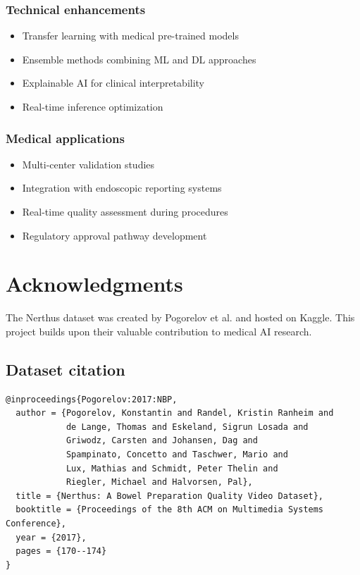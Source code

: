 \documentclass[11pt]{article}
\begin{document}
\subsubsection{Technical enhancements}
\begin{itemize}
    \item Transfer learning with medical pre-trained models
    \item Ensemble methods combining ML and DL approaches
    \item Explainable AI for clinical interpretability
    \item Real-time inference optimization
\end{itemize}

\subsubsection{Medical applications}
\begin{itemize}
    \item Multi-center validation studies
    \item Integration with endoscopic reporting systems
    \item Real-time quality assessment during procedures
    \item Regulatory approval pathway development
\end{itemize}

\section*{Acknowledgments}

The Nerthus dataset was created by Pogorelov et al. and hosted on Kaggle. This project builds upon their valuable contribution to medical AI research.

\subsection*{Dataset citation}
\begin{verbatim}
@inproceedings{Pogorelov:2017:NBP,
  author = {Pogorelov, Konstantin and Randel, Kristin Ranheim and 
            de Lange, Thomas and Eskeland, Sigrun Losada and 
            Griwodz, Carsten and Johansen, Dag and 
            Spampinato, Concetto and Taschwer, Mario and 
            Lux, Mathias and Schmidt, Peter Thelin and 
            Riegler, Michael and Halvorsen, Pal},
  title = {Nerthus: A Bowel Preparation Quality Video Dataset},
  booktitle = {Proceedings of the 8th ACM on Multimedia Systems Conference},
  year = {2017},
  pages = {170--174}
}
\end{verbatim}
\end{document}
